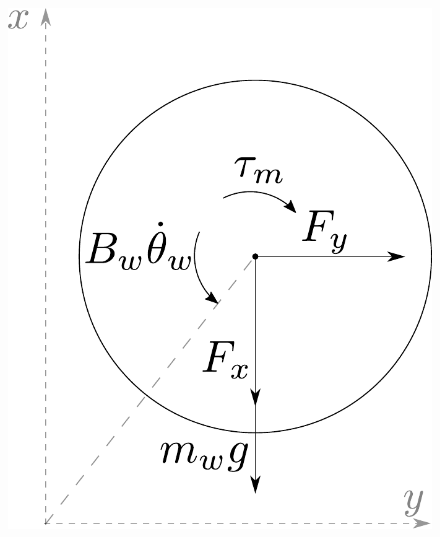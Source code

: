 \begin{minipage}{\linewidth}
  	\begin{minipage}{0.45\linewidth}
  		\begin{figure}[H]
  			\includegraphics[scale=.53]{figures/freeBodyWheel}
  			\centering
  			\captionsetup{justification=centering}
  			\label{freeBodyWheel}
  		\end{figure}\vspace{-5mm}
  	\end{minipage}
  \end{minipage}

